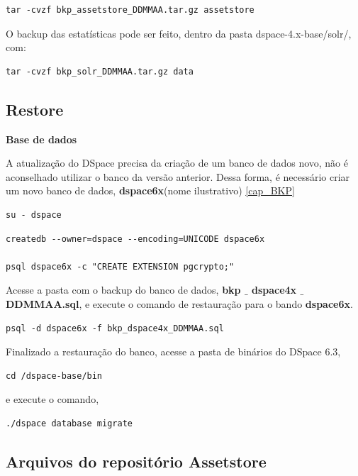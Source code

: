 \documentclass[12pt,hidelinks]{article}
\begin{document}
\begin{verbatim}
tar -cvzf bkp_assetstore_DDMMAA.tar.gz assetstore
\end{verbatim}

O backup das estatísticas pode ser feito, dentro da pasta dspace-4.x-base/solr/, com:

\begin{verbatim}
tar -cvzf bkp_solr_DDMMAA.tar.gz data
\end{verbatim}

\subsection{Restore}

\textbf{Base de dados}
\singlespacing

A atualização do DSpace precisa da criação de um banco de dados novo, não é aconselhado utilizar o banco da versão anterior. Dessa forma, é necessário criar um novo banco de dados, \textbf{dspace6x}(nome ilustrativo) \ref{cap_BKP} 

\begin{verbatim}
su - dspace
\end{verbatim}


\begin{verbatim}
createdb --owner=dspace --encoding=UNICODE dspace6x

psql dspace6x -c "CREATE EXTENSION pgcrypto;"
\end{verbatim}

Acesse a pasta com o backup do banco de dados, \textbf{bkp $\_$ dspace4x $\_$ DDMMAA.sql}, e execute o comando de restauração para o bando \textbf{dspace6x}.


\begin{verbatim}
psql -d dspace6x -f bkp_dspace4x_DDMMAA.sql
\end{verbatim}

Finalizado a restauração do banco, acesse a pasta de binários do DSpace 6.3,
\begin{verbatim}
cd /dspace-base/bin
\end{verbatim}
e execute o comando,
\begin{verbatim}
./dspace database migrate
\end{verbatim}

\subsection{Arquivos do repositório Assetstore}
\end{document}
